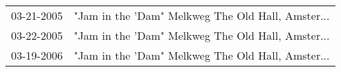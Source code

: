 \begin{supertabular}{ll}
 03-21-2005 &  "Jam in the 'Dam" Melkweg The Old Hall, Amster... \\
 03-22-2005 &  "Jam in the 'Dam" Melkweg The Old Hall, Amster... \\
 03-19-2006 &  "Jam in the 'Dam" Melkweg The Old Hall, Amster... \\
\end{supertabular}
